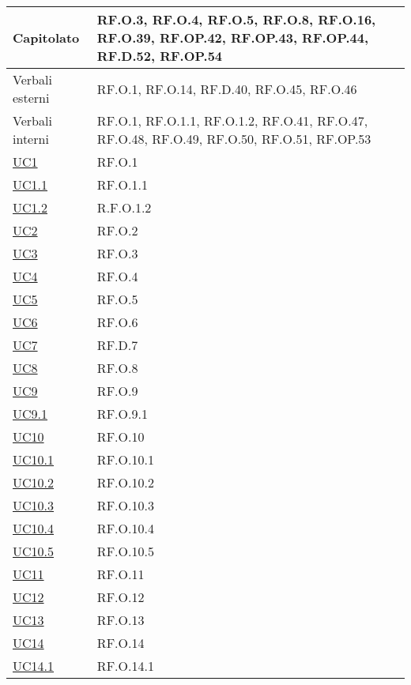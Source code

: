 \begin{adjustwidth}{-0.5cm}{-0.5cm}
\begin{longtable}{|P{4,5cm}|>{\arraybackslash}P{9cm}|}
    Capitolato & RF.O.3, RF.O.4, RF.O.5, RF.O.8, RF.O.16, RF.O.39, RF.OP.42, RF.OP.43, RF.OP.44, RF.D.52, RF.OP.54 \\
    \hline
    Verbali esterni & RF.O.1, RF.O.14, RF.D.40, RF.O.45, RF.O.46 \\
    \hline
    Verbali interni & RF.O.1, RF.O.1.1, RF.O.1.2, RF.O.41, RF.O.47, RF.O.48, RF.O.49, RF.O.50, RF.O.51, RF.OP.53 \\
    \hline
    \hyperref[UC1]{UC1} & RF.O.1 \\
    \hline
    \hyperref[UC1point1]{UC1.1} & RF.O.1.1 \\
    \hline
    \hyperref[UC1point2]{UC1.2} & R.F.O.1.2 \\
    \hline
    \hyperref[UC2]{UC2} & RF.O.2 \\
    \hline
    \hyperref[UC3]{UC3} & RF.O.3 \\
    \hline
    \hyperref[UC4]{UC4} & RF.O.4 \\
    \hline
    \hyperref[UC5]{UC5} & RF.O.5 \\
    \hline
    \hyperref[UC6]{UC6} & RF.O.6 \\
    \hline
    \hyperref[UC7]{UC7} & RF.D.7 \\
    \hline
    \hyperref[UC8]{UC8} & RF.O.8 \\
    \hline
    \hyperref[UC9]{UC9} & RF.O.9 \\
    \hline
    \hyperref[UC9point1]{UC9.1} & RF.O.9.1 \\
    \hline
    \hyperref[UC10]{UC10} & RF.O.10 \\
    \hline
    \hyperref[UC10point1]{UC10.1} & RF.O.10.1 \\ 
    \hline
    \hyperref[UC10point2]{UC10.2} & RF.O.10.2\\
    \hline
    \hyperref[UC10point3]{UC10.3} & RF.O.10.3\\
    \hline
    \hyperref[UC10point4]{UC10.4} & RF.O.10.4\\
    \hline
    \hyperref[UC10point5]{UC10.5} & RF.O.10.5\\
    \hline
    \hyperref[UC11]{UC11} & RF.O.11 \\
    \hline
    \hyperref[UC12]{UC12} & RF.O.12 \\
    \hline
    \hyperref[UC13]{UC13} & RF.O.13 \\
    \hline
    \hyperref[UC14]{UC14} & RF.O.14 \\
    \hline
    \hyperref[UC14point1]{UC14.1} & RF.O.14.1 \\

\end{longtable}
\end{adjustwidth}
